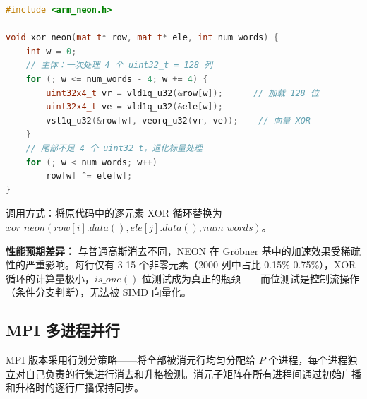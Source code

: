 \documentclass[a4paper]{article}
\begin{document}
\begin{lstlisting}[title=NEON 向量化异或消去,frame=trbl,language={C++}]
#include <arm_neon.h>

void xor_neon(mat_t* row, mat_t* ele, int num_words) {
    int w = 0;
    // 主体：一次处理 4 个 uint32_t = 128 列
    for (; w <= num_words - 4; w += 4) {
        uint32x4_t vr = vld1q_u32(&row[w]);      // 加载 128 位
        uint32x4_t ve = vld1q_u32(&ele[w]);
        vst1q_u32(&row[w], veorq_u32(vr, ve));    // 向量 XOR
    }
    // 尾部不足 4 个 uint32_t，退化标量处理
    for (; w < num_words; w++)
        row[w] ^= ele[w];
}
\end{lstlisting}

调用方式：将原代码中的逐元素 XOR 循环替换为 $xor\_neon(row[i].data(), ele[j].data(), num\_words)$。

\textbf{性能预期差异：} 与普通高斯消去不同，NEON 在 Gröbner 基中的加速效果受稀疏性的严重影响。每行仅有 3-15 个非零元素（2000 列中占比 0.15\%-0.75\%），XOR 循环的计算量极小，$is\_one()$ 位测试成为真正的瓶颈——而位测试是控制流操作（条件分支判断），无法被 SIMD 向量化。

\subsection{MPI 多进程并行}

MPI 版本采用行划分策略——将全部被消元行均匀分配给 $P$ 个进程，每个进程独立对自己负责的行集进行消去和升格检测。消元子矩阵在所有进程间通过初始广播和升格时的逐行广播保持同步。
\end{document}
